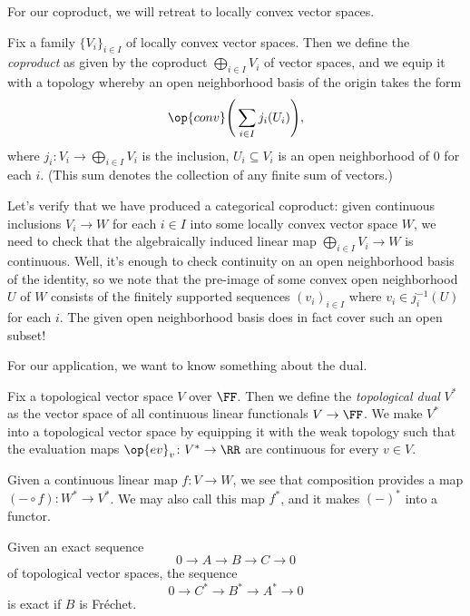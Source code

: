 \documentclass[notes.tex]{subfiles}
\begin{document}
For our coproduct, we will retreat to locally convex vector spaces.
\begin{definition}[coproduct]
	Fix a family $\{V_i\}_{i\in I}$ of locally convex vector spaces. Then we define the \textit{coproduct} as given by the coproduct $\bigoplus_{i\in I}V_i$ of vector spaces, and we equip it with a topology whereby an open neighborhood basis of the origin takes the form
	\[\op{conv}\Bigg(\sum_{i\in I}j_i(U_i)\Bigg),\]
	where $j_i\colon V_i\to\bigoplus_{i\in I}V_i$ is the inclusion, $U_i\subseteq V_i$ is an open neighborhood of $0$ for each $i$. (This sum denotes the collection of any finite sum of vectors.)
\end{definition}
\begin{remark}
	Let's verify that we have produced a categorical coproduct: given continuous inclusions $V_i\to W$ for each $i\in I$ into some locally convex vector space $W$, we need to check that the algebraically induced linear map $\bigoplus_{i\in I}V_i\to W$ is continuous. Well, it's enough to check continuity on an open neighborhood basis of the identity, so we note that the pre-image of some convex open neighborhood $U$ of $W$ consists of the finitely supported sequences $(v_i)_{i\in I}$ where $v_i\in j_i^{-1}(U)$ for each $i$. The given open neighborhood basis does in fact cover such an open subset!
\end{remark}
For our application, we want to know something about the dual.
\begin{definition}[dual]
	Fix a topological vector space $V$ over $\FF$. Then we define the \textit{topological dual} $V^*$ as the vector space of all continuous linear functionals $V\to\FF$. We make $V^*$ into a topological vector space by equipping it with the weak topology such that the evaluation maps $\op{ev}_v\colon V^*\to\RR$ are continuous for every $v\in V$.
\end{definition}
\begin{remark}
	Given a continuous linear map $f\colon V\to W$, we see that composition provides a map $(-\circ f)\colon W^*\to V^*$. We may also call this map $f^*$, and it makes $(-)^*$ into a functor.
\end{remark}
\begin{lemma} \label{lem:dual-exact}
	Given an exact sequence
	\[0\to A\to B\to C\to0\]
	of topological vector spaces, the sequence
	\[0\to C^*\to B^*\to A^*\to0\]
	is exact if $B$ is Fr\'echet.
\end{lemma}
\end{document}

